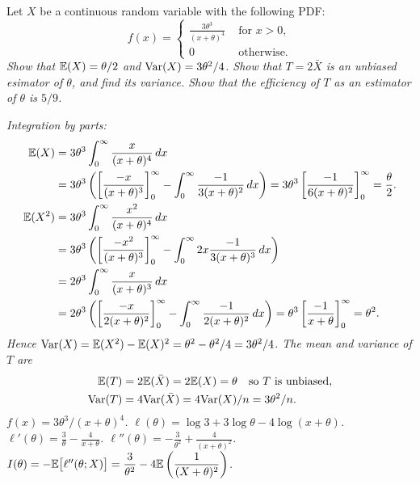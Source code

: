 \begin{example}
Let $X$ be a continuous random variable with the following PDF:
\[
f(x) = \begin{cases}
	\displaystyle\frac{3\theta^3}{(x+\theta)^4}	& \text{ for $x>0$,} \\
	0											& \text{ otherwise.}
\end{cases}
\]
\ben
\it Show that $\mathbb{E}(X)=\theta/2$ and $\text{Var}(X) = 3\theta^2/4$.
\it Show that $T = 2\bar{X}$ is an unbiased esimator of $\theta$, and find its variance.
\it Show that the efficiency of $T$ as an estimator of $\theta$ is $5/9$.
\een
\begin{solution}
\ben
\it %
Integration by parts:
\begin{align*}
\mathbb{E}(X)
	& = 3\theta^3 \int_0^{\infty} \frac{x}{(x+\theta)^4}\,dx \\
	& = 3\theta^3\left(\left[\frac{-x}{(x+\theta)^3}\right]_0^\infty - \int_0^\infty \frac{-1}{3(x+\theta)^2}\,dx\right)
	= 3\theta^3\left[\frac{-1}{6(x+\theta)^2}\right]_0^\infty = \frac{\theta}{2}. \\
\mathbb{E}(X^2)
	& = 3\theta^3 \int_0^{\infty} \frac{x^2}{(x+\theta)^4}\,dx \\
	& = 3\theta^3\left(\left[\frac{-x^2}{(x+\theta)^3}\right]_0^\infty - \int_0^\infty 2x\frac{-1}{3(x+\theta)^3}\,dx\right) \\
	& = 2\theta^3\int_0^\infty \frac{x}{(x+\theta)^3}\,dx \\
	& = 2\theta^3\left(\left[\frac{-x}{2(x+\theta)^2}\right]_0^\infty - \int_0^\infty \frac{-1}{2(x+\theta)^2}\,dx\right)
	= \theta^3\left[\frac{-1}{x+\theta}\right]_0^\infty = \theta^2.
	\end{align*}
Hence $\text{Var}(X) = \mathbb{E}(X^2)-\mathbb{E}(X)^2 = \theta^2 - \theta^2/4 = 3\theta^2/4$.	
\it %
The mean and variance of $T$ are
\begin{align*}
\mathbb{E}(T) 
	& = 2\mathbb{E}(\bar{X}) = 2\mathbb{E}(X) = \theta \quad\text{so $T$ is unbiased}, \\
\text{Var}(T) 
	& = 4\text{Var}(\bar{X}) = 4\text{Var}(X)/n = 3\theta^2/n.
\end{align*}
\it %
\bit
\it $f(x) = 3\theta^3/(x+\theta)^4$.
\it $\ell(\theta) = \log 3 + 3\log\theta - 4\log(x+\theta)$.
\it $\ell'(\theta) = \displaystyle\frac{3}{\theta} - \frac{4}{x+\theta}$.
\it $\ell''(\theta) = -\displaystyle\frac{3}{\theta^2} + \frac{4}{(x+\theta)^2}$.
\it $I(\theta) = -\mathbb{E}\big[\ell''(\theta;X)\big] = \displaystyle\frac{3}{\theta^2} - 4\mathbb{E}\left(\frac{1}{(X+\theta)^2}\right)$.

\end{solution}
\end{example}
